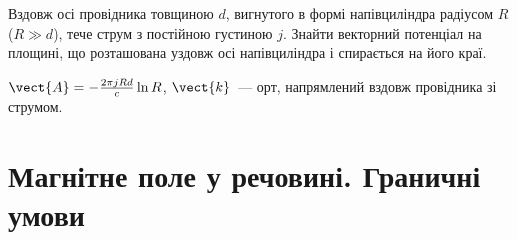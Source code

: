 \begin{problem} %
Вздовж осі провідника товщиною $d$, вигнутого в формі напівциліндра радіусом $R$ ($R \gg d$), тече струм з постійною густиною $j$. Знайти векторний потенціал на площині, що розташована уздовж осі напівциліндра і спирається на його краї.
\begin{solution}
	$\vect{A} = - \frac{2\pi jRd}{c}\ln R$,  $\vect{k}$~--- орт, напрямлений вздовж провідника зі струмом.
\end{solution}
\end{problem}

\section{Магнітне поле у речовині. Граничні умови}

